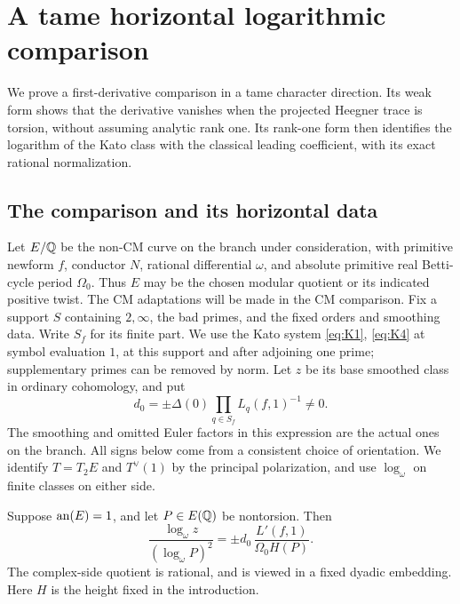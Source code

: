 \section{A tame horizontal logarithmic comparison}\label{sec:tame}

We prove a first-derivative comparison in a tame character direction. Its
weak form shows that the derivative vanishes when the projected Heegner
trace is torsion, without assuming analytic rank one. Its rank-one form
then identifies the logarithm of the
Kato class with the classical leading coefficient, with its exact rational
normalization.

\subsection{The comparison and its horizontal data}

Let \(E/\mathbb Q\) be the non-CM curve on the branch under consideration, with
primitive newform \(f\), conductor \(N\), rational differential \(\omega\),
and absolute primitive real Betti-cycle period \(\Omega_0\). Thus \(E\)
may be the chosen modular quotient or its indicated positive twist.
The CM adaptations will be made in the CM comparison. Fix a support
\(S\) containing \(2,\infty\), the bad primes, and the fixed orders and
smoothing data. Write \(S_f\) for its finite part. We use the Kato system
\eqref{eq:K1}, \eqref{eq:K4} at symbol evaluation \(1\), at this support
and after adjoining one prime; supplementary primes can be removed by norm.
Let \(z\) be its base smoothed class in ordinary cohomology, and put
\begin{equation}\label{tame:d0}
 d_0=\pm\Delta(0)\prod_{q\in S_f}L_q(f,1)^{-1}\ne0.
\end{equation}
The smoothing and omitted Euler factors in this expression are the actual
ones on the branch. All signs below come from a consistent choice of
orientation. We identify \(T=T_2E\) and \(T^\vee(1)\) by the principal
polarization, and use \(\log_\omega\) on finite classes on either side.

\begin{theorem}\label{tame:logarithm}
Suppose \(\operatorname{an}(E)=1\), and let \(P\in E(\mathbb Q)\) be nontorsion. Then
\[
 \frac{\log_\omega z}{(\log_\omega P)^2}
   =\pm d_0\,\frac{L'(f,1)}{\Omega_0H(P)}.
 \tag{T1}\label{eq:T1}
\]
The complex-side quotient is rational, and is viewed in a fixed dyadic
embedding. Here \(H\) is the height fixed in the introduction.
\end{theorem}

